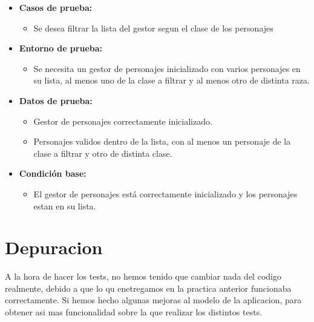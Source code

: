 \documentclass{article}
\begin{document}
\begin{itemize}
	\item \textbf{Casos de prueba:}
	\begin{itemize}
		\item Se desea filtrar la lista del gestor segun el clase de los personajes
	\end{itemize}
	
	\item \textbf{Entorno de prueba:}
	\begin{itemize}
		\item Se necesita un gestor de personajes inicializado con varios personajes en su lista, al menos uno de la clase a filtrar y al menos otro de distinta raza.
	\end{itemize}
	
	\item \textbf{Datos de prueba:}
	\begin{itemize}
		\item Gestor de personajes correctamente inicializado.
		\item Personajes validos dentro de la lista, con al menos un personaje de la clase a filtrar y otro de distinta clase.
	\end{itemize}
	
	\item \textbf{Condición base:}
	\begin{itemize}
		\item El gestor de personajes está correctamente inicializado y los personajes estan en su lista.
	\end{itemize}
	
\end{itemize}

\section{Depuracion}

A la hora de hacer los tests, no hemos tenido que cambiar nada del codigo realmente, debido a que lo qu enetregamos en la practica anterior funcionaba correctamente. Si hemos hecho algunas mejoras al modelo de la aplicacion, para obtener asi mas funcionalidad sobre la que realizar los distintos tests.
\end{document}
